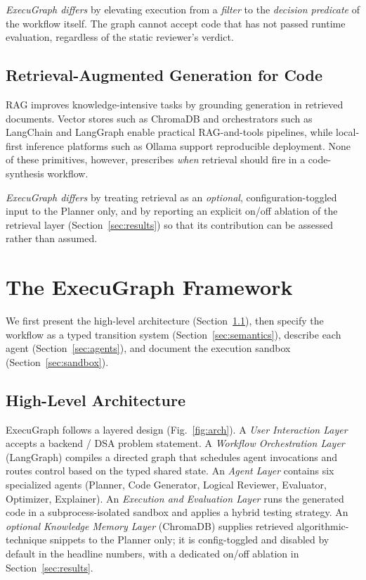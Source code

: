 \documentclass[journal]{IEEEtran}
\begin{document}
\textit{ExecuGraph differs} by elevating execution from a \emph{filter} to the \emph{decision predicate} of the workflow itself. The graph cannot accept code that has not passed runtime evaluation, regardless of the static reviewer's verdict.

\subsection{Retrieval-Augmented Generation for Code}
RAG \cite{lewis2020rag} improves knowledge-intensive tasks by grounding generation in retrieved documents. Vector stores such as ChromaDB \cite{chroma} and orchestrators such as LangChain \cite{langchain} and LangGraph \cite{langgraph} enable practical RAG-and-tools pipelines, while local-first inference platforms such as Ollama \cite{ollama} support reproducible deployment. None of these primitives, however, prescribes \emph{when} retrieval should fire in a code-synthesis workflow.

\textit{ExecuGraph differs} by treating retrieval as an \emph{optional}, configuration-toggled input to the Planner only, and by reporting an explicit on/off ablation of the retrieval layer (Section~\ref{sec:results}) so that its contribution can be assessed rather than assumed.


\section{The ExecuGraph Framework}\label{sec:framework}

We first present the high-level architecture (Section~\ref{sec:arch}), then specify the workflow as a typed transition system (Section~\ref{sec:semantics}), describe each agent (Section~\ref{sec:agents}), and document the execution sandbox (Section~\ref{sec:sandbox}).

\subsection{High-Level Architecture}\label{sec:arch}
ExecuGraph follows a layered design (Fig.~\ref{fig:arch}). A \emph{User Interaction Layer} accepts a backend / DSA problem statement. A \emph{Workflow Orchestration Layer} (LangGraph) compiles a directed graph that schedules agent invocations and routes control based on the typed shared state. An \emph{Agent Layer} contains six specialized agents (Planner, Code Generator, Logical Reviewer, Evaluator, Optimizer, Explainer). An \emph{Execution and Evaluation Layer} runs the generated code in a subprocess-isolated sandbox and applies a hybrid testing strategy. An \emph{optional Knowledge Memory Layer} (ChromaDB) supplies retrieved algorithmic-technique snippets to the Planner only; it is config-toggled and disabled by default in the headline numbers, with a dedicated on/off ablation in Section~\ref{sec:results}.
\end{document}

